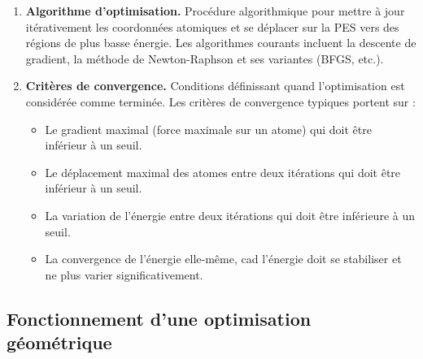 \documentclass[12pt,a4paper]{article} %
\numberwithin{equation}{section} %
\numberwithin{figure}{section} %
\numberwithin{table}{section} %
\begin{document}
\begin{enumerate}
  Une fois calculée, la matrice Hessienne peut être diagonalisée pour obtenir les \textbf{constantes de force harmoniques}, les \textbf{fréquences vibrationnelles} et les \textbf{modes normaux de vibration} de la molécule au voisinage du point stationnaire. L'analyse des valeurs propres (fréquences vibrationnelles) du Hessien permet de déterminer la nature du point stationnaire :
  \begin{itemize}
    \item \textbf{Minimum local.} Toutes les valeurs propres du Hessien sont positives (fréquences vibrationnelles réelles).
    \item \textbf{État de transition.} Une (et une seule) valeur propre du Hessien est négative (fréquence vibrationnelle imaginaire), correspondant au mouvement le long de la coordonnée de réaction.
    \item \textbf{Maximum d'ordre supérieur.} Plus d'une valeur propre négative (rare en chimie moléculaire, généralement instable).
  \end{itemize}

 \item \textbf{Algorithme d'optimisation.} Procédure algorithmique pour mettre à jour itérativement les coordonnées atomiques et se déplacer sur la PES vers des régions de plus basse énergie. Les algorithmes courants incluent la descente de gradient, la méthode de Newton-Raphson et ses variantes (BFGS, etc.).

 \item \textbf{Critères de convergence.} Conditions définissant quand l'optimisation est considérée comme terminée. Les critères de convergence typiques portent sur :
 \begin{itemize}
  \item Le gradient maximal (force maximale sur un atome) qui doit être inférieur à un seuil.
  \item Le déplacement maximal des atomes entre deux itérations qui doit être inférieur à un seuil.
  \item La variation de l'énergie entre deux itérations qui doit être inférieure à un seuil.
  \item La convergence de l'énergie elle-même, cad l'énergie doit se stabiliser et ne plus varier significativement.
 \end{itemize}
\end{enumerate}

\subsection{Fonctionnement d'une optimisation géométrique}
\end{document}
